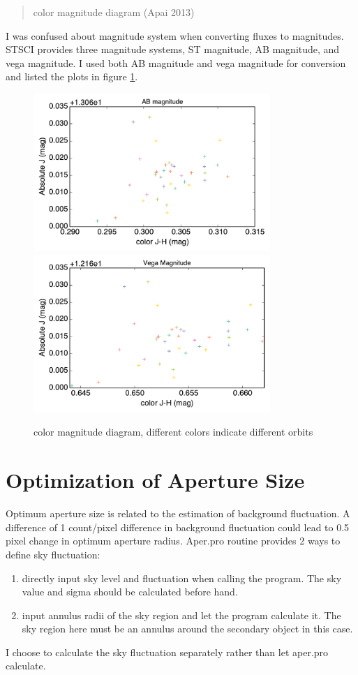 \documentclass[paper=letter, fontsize=11pt]{scrartcl} %
\numberwithin{equation}{section} %
\numberwithin{figure}{section} %
\numberwithin{table}{section} %
\begin{document}
\begin{quote}
  color magnitude diagram (Apai 2013)
\end{quote}
I was confused about magnitude system when converting fluxes to
magnitudes. STSCI provides three magnitude systems, ST magnitude, AB
magnitude, and vega magnitude. I used both AB magnitude and vega
magnitude for conversion and listed the plots in figure \ref{fig:cmd}.

\begin{figure}
  \centering
  \includegraphics[width=0.8\textwidth]{CMD_ABmag_Nov20}
  \includegraphics[width=0.8\textwidth]{CMD_Vegamag_Nov20}
  \caption{color magnitude diagram, different colors indicate
    different orbits}
  \label{fig:cmd}
\end{figure}


\section{Optimization of Aperture Size}

Optimum aperture size is related to the estimation of background
fluctuation. A difference of 1 count/pixel difference in background
fluctuation could lead to 0.5 pixel change in optimum aperture
radius. Aper.pro routine provides 2 ways to define sky fluctuation:
\begin{enumerate}
\item ﻿﻿﻿﻿directly input sky level and fluctuation when calling the program. The sky value and sigma should be calculated before hand.
\item  input annulus radii of the sky region and let the program calculate it. The sky region here must be an annulus around the secondary object in this case.
\end{enumerate}
I choose to calculate the sky fluctuation separately rather than let aper.pro calculate.     
\end{document}
